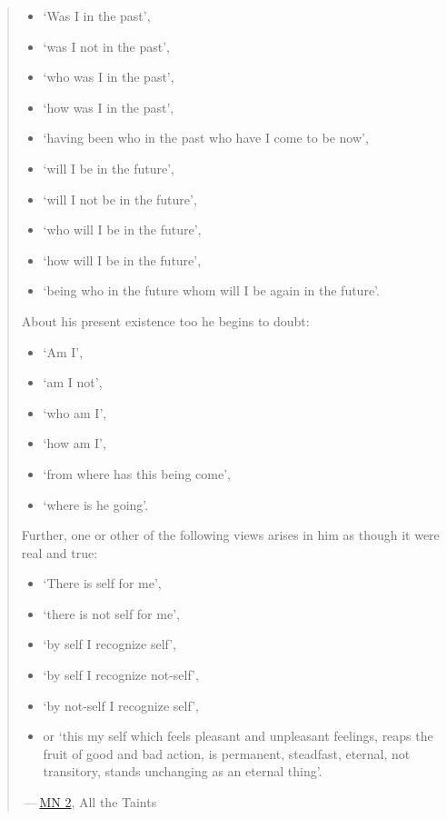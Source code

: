 \begin{quote}
\begin{itemize}
\item
  `Was I in the past',
\item
  `was I not in the past',
\item
  `who was I in the past',
\item
  `how was I in the past',
\item
  `having been who in the past who have I come to be now',
\item
  `will I be in the future',
\item
  `will I not be in the future',
\item
  `who will I be in the future',
\item
  `how will I be in the future',
\item
  `being who in the future whom will I be again in the future'.
\end{itemize}

About his present existence too he begins to doubt:

\begin{itemize}
\item
  `Am I',
\item
  `am I not',
\item
  `who am I',
\item
  `how am I',
\item
  `from where has this being come',
\item
  `where is he going'.
\end{itemize}

Further, one or other of the following views arises in him as though it were real and true:

\begin{itemize}
\item
  `There is self for me',
\item
  `there is not self for me',
\item
  `by self I recognize self',
\item
  `by self I recognize not-self',
\item
  `by not-self I recognize self',
\item
  or `this my self which feels pleasant and unpleasant feelings, reaps the fruit of good and bad action, is permanent, steadfast, eternal, not transitory, stands unchanging as an eternal thing'.
\end{itemize}

 --- \href{https://suttacentral.net/mn2/en/bodhi}{MN 2}, All the Taints
\end{quote}

